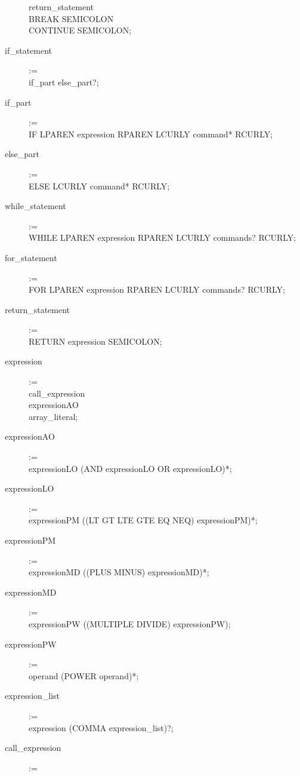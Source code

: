 \begin{description}
        return\_statement \textbar \\
        BREAK SEMICOLON \textbar \\
        CONTINUE SEMICOLON;
    \item[if\_statement] := \hfill \\
        if\_part else\_part?;
    \item[if\_part] := \hfill \\
        IF LPAREN expression RPAREN LCURLY command* RCURLY;
    \item[else\_part] := \hfill \\
        ELSE LCURLY command* RCURLY;
    \item[while\_statement] := \hfill \\
        WHILE LPAREN expression RPAREN LCURLY commands? RCURLY;
    \item[for\_statement] := \hfill \\
        FOR LPAREN expression RPAREN LCURLY commands? RCURLY;
    \item[return\_statement] := \hfill \\
        RETURN expression SEMICOLON;
    \item[expression] := \hfill \\
        call\_expression \textbar \\
        expressionAO \textbar \\
        array\_literal;
    \item[expressionAO] := \hfill \\
        expressionLO (AND expressionLO \textbar OR expressionLO)*;
    \item[expressionLO] := \hfill \\
        expressionPM ((LT \textbar GT \textbar LTE \textbar GTE \textbar EQ \textbar NEQ) expressionPM)*;
    \item[expressionPM] := \hfill \\
        expressionMD ((PLUS \textbar MINUS) expressionMD)*;
    \item[expressionMD] := \hfill \\
        expressionPW ((MULTIPLE \textbar DIVIDE) expressionPW);
    \item[expressionPW] := \hfill \\
        operand (POWER operand)*;
    \item[expression\_list] := \hfill \\
        expression (COMMA expression\_list)?;
    \item[call\_expression] := \hfill \\

\end{description}
